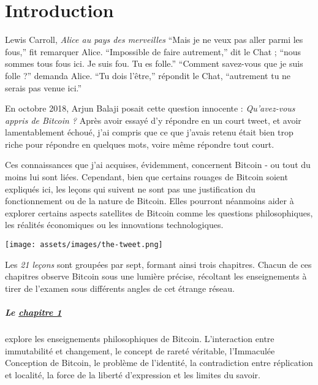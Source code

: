 \chapter*{Introduction}
\label{ch:introduction}

\begin{chapquote}{Lewis Carroll, \textit{Alice au pays des merveilles}}
\enquote{Mais je ne veux pas aller parmi les fous,} fit remarquer Alice.
\enquote{Impossible de faire autrement,} dit le Chat ; \enquote{nous sommes tous
fous ici. Je suis fou. Tu es folle.} \enquote{Comment savez-vous que je suis
folle ?} demanda Alice. \enquote{Tu dois l’être,} répondit le Chat,
\enquote{autrement tu ne serais pas venue ici.}
\end{chapquote}

En octobre 2018, Arjun Balaji posait cette question innocente :
\textit{Qu'avez-vous appris de Bitcoin ?} Après avoir essayé d'y répondre en un
court tweet, et avoir lamentablement échoué, j'ai compris que ce que j'avais
retenu était bien trop riche pour répondre en quelques mots, voire même répondre
tout court.

Ces connaissances que j'ai acquises, évidemment, concernent Bitcoin - ou tout du
moins lui sont liées. Cependant, bien que certains rouages de Bitcoin soient
expliqués ici, les leçons qui suivent ne sont pas une justification du
fonctionnement ou de la nature de Bitcoin. Elles pourront néanmoins aider à
explorer certains aspects satellites de Bitcoin comme les questions
philosophiques, les réalités économiques ou les innovations technologiques.

\begin{center}
  \texttt{[image: assets/images/the-tweet.png]}
\end{center}

Les \textit{21 leçons} sont groupées par sept, formant ainsi trois chapitres.
Chacun de ces chapitres observe Bitcoin sous une lumière précise, récoltant les
enseignements à tirer de l'examen sous différents angles de cet étrange réseau.

\paragraph{Le \hyperref[ch:philosophy]{chapitre 1}}{ explore les enseignements
philosophiques de Bitcoin. L'interaction entre immutabilité et changement, le
concept de rareté véritable, l'Immaculée Conception de Bitcoin, le problème de
l'identité, la contradiction entre réplication et localité, la force de la
liberté d'expression et les limites du savoir.}

